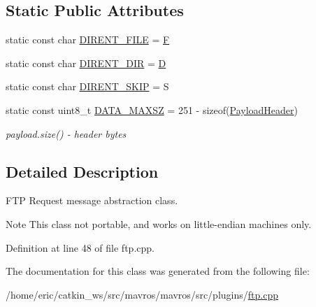 \subsection*{Static Public Attributes}
\begin{DoxyCompactItemize}
\item 
static const char \mbox{\hyperlink{group__plugin_ga305f7ede1a81342461da0e6a5474b530}{D\+I\+R\+E\+N\+T\+\_\+\+F\+I\+LE}} = \textquotesingle{}\mbox{\hyperlink{mavlink__sha256_8h_a42257a545daf5b7933d6e8f96adc74f2}{F}}\textquotesingle{}
\item 
static const char \mbox{\hyperlink{group__plugin_ga4968be6fa6605fa70b81152e83bbef67}{D\+I\+R\+E\+N\+T\+\_\+\+D\+IR}} = \textquotesingle{}\mbox{\hyperlink{mavlink__sha256_8h_af316c33cc298530f245e8b55330e86b5}{D}}\textquotesingle{}
\item 
static const char \mbox{\hyperlink{group__plugin_ga5628fc53877a3f7a45b2ec1ec2a8652e}{D\+I\+R\+E\+N\+T\+\_\+\+S\+K\+IP}} = \textquotesingle{}S\textquotesingle{}
\item 
static const uint8\+\_\+t \mbox{\hyperlink{group__plugin_gad25555fafe3a6aa0f078fec9099a6431}{D\+A\+T\+A\+\_\+\+M\+A\+X\+SZ}} = 251 -\/ sizeof(\mbox{\hyperlink{structmavros_1_1std__plugins_1_1FTPRequest_1_1PayloadHeader}{Payload\+Header}})
\begin{DoxyCompactList}\small\item\em payload.\+size() -\/ header bytes \end{DoxyCompactList}\end{DoxyCompactItemize}


\subsection{Detailed Description}
F\+TP Request message abstraction class. 

\begin{DoxyNote}{Note}
This class not portable, and works on little-\/endian machines only. 
\end{DoxyNote}


Definition at line 48 of file ftp.\+cpp.



The documentation for this class was generated from the following file\+:\begin{DoxyCompactItemize}
\item 
/home/eric/catkin\+\_\+ws/src/mavros/mavros/src/plugins/\mbox{\hyperlink{ftp_8cpp}{ftp.\+cpp}}\end{DoxyCompactItemize}
